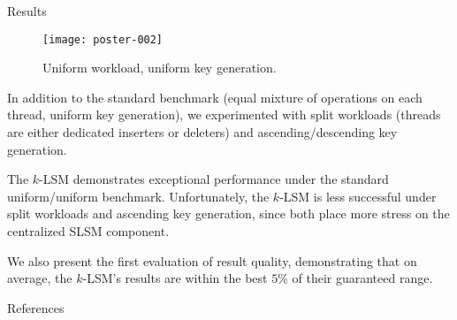 \documentclass[final,hyperref={pdfpagelabels=true}]{beamer}
\newcommand{\klsm}{$k$-LSM\xspace}
\begin{document}
\begin{frame}
\begin{columns}[t]
\begin{column}{.45\textwidth}
\begin{block}{Results}
\begin{itemize}
\begin{figure}[ht]
\begin{center}
\texttt{[image: poster-002]}
\end{center}
\caption{Uniform workload, uniform key generation.}
\label{fig:mars_uni_uni}
\end{figure}

In addition to the standard benchmark (equal mixture of operations on each thread,
uniform key generation), we experimented with split workloads (threads are either
dedicated inserters or deleters) and ascending/descending key generation.

The \klsm demonstrates exceptional performance under the standard uniform/uniform
benchmark.
Unfortunately, the \klsm is less successful under split workloads and ascending
key generation, since both place more stress on the centralized \ac{SLSM} component.

We also present the first evaluation of result quality, demonstrating that
on average, the \klsm's results are within the best $5\%$ of their guaranteed
range.

\end{itemize}

\end{block}

\begin{block}{References}
\printbibliography
\end{block}
\end{column}
\end{columns}

\end{frame}
\end{document}
